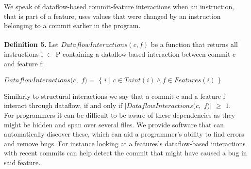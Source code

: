 We speak of dataflow-based commit-feature interactions when an instruction, that is part of a feature, uses values that were changed by an instruction belonging to a commit earlier in the program. \\ \\
\textbf{Definition 5.} Let $DataflowInteractions(c, f)$ be a function that returns all instructions i $\in$ P containing a dataflow-based interaction between commit c and feature f: 
\begin{center} $DataflowInteractions(c,$ $f) = $ $\{$ $i$ $|$ $ c \in Taint(i) \land f \in Features(i)$ $\}$ \end{center}
Similarly to structural interactions we say that a commit c and a feature f interact through dataflow, if and only if $|DataflowInteractions(c,$ $f)|$ $\geq$ $1$. \\
For programmers it can be difficult to be aware of these dependencies as they might be hidden and span over several files.
We provide software that can automatically discover these, which can aid a programmer's ability to find errors and remove bugs.
For instance looking at a features's dataflow-based interactions with recent commits can help detect the commit that might have caused a bug in said feature.
\fi
